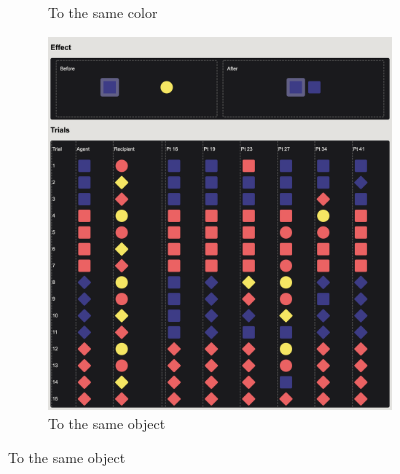 \documentclass{article}
\begin{document}
\begin{figure}[h!]
\begin{subfigure}[t]{0.31\textwidth}
  	\caption{To the same color} \label{fig:raw_g3}
  \end{subfigure}
  \hfill
  \begin{subfigure}[t]{0.31\textwidth}
  	\centering
  	\includegraphics[width=\linewidth]{raw_g6} 
  	\caption{To the same object} \label{fig:raw_g6}
  \end{subfigure}


\end{figure}
\end{document}
